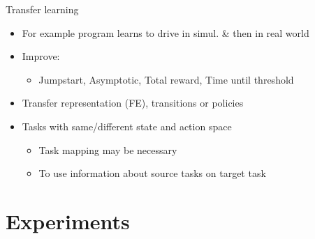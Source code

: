 \begin{frame}[fragile]{Transfer learning}
{\begin{itemize}
        \item For example program learns to drive in simul. \& then in real world
        \item Improve:
        \begin{itemize}
            \item Jumpstart, Asymptotic, Total reward, Time until threshold
        \end{itemize}
        \item Transfer representation (FE), transitions or policies
        \item Tasks with same/different state and action space
        \begin{itemize}
            \item Task mapping may be necessary
            \item To use information about source tasks on target task
        \end{itemize}
    \end{itemize}
}
\end{frame}

\part{Experiments}
